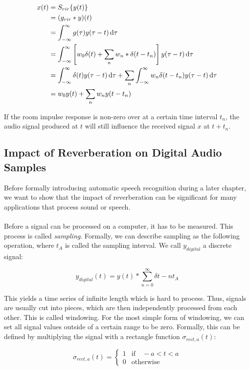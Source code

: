 \begin{align*}
x(t) &= S_{rir}\{y(t)\} \\
     &= (g_{rir} * y)(t) \\
     &= \int_{-\infty}^{\infty} g(\tau)y(\tau - t) \mathop{}\!\mathrm{d}\tau \\
     &= \int_{-\infty}^{\infty} \left[ w_0 \delta(t) + \sum_{n} w_n * \delta(t - t_n)\right] y(\tau - t) \mathop{}\!\mathrm{d}\tau \\
     &= \int_{-\infty}^{\infty} \delta(t) y(\tau - t) \mathop{}\!\mathrm{d}\tau + \sum_{n}  \int_{-\infty}^{\infty} w_n \delta(t - t_n) y(\tau - t) \mathop{}\!\mathrm{d}\tau  \\
     &= w_0 y(t) + \sum_{n} w_n y(t - t_n)
\end{align*}

If the room impulse response is non-zero over at a certain time interval $t_n$, the audio signal produced at $t$ will still influence the received signal $x$ at $t + t_n$. 

\subsection{Impact of Reverberation on Digital Audio Samples}

Before formally introducing automatic speech recognition during a later chapter, we want to show that the impact of reverberation can be significant for many applications that process sound or speech.\\ \\
Before a signal can be processed on a computer, it has to be measured. This process is called \textit{sampling}. Formally, we can describe sampling as the following operation, where $t_A$ is called the sampling interval. We call $y_{digital}$ a discrete signal: 

\[
y_{digital}(t) = y(t) * \sum_{n = 0}^{\infty} \delta{t - nt_A} 
\]

This yields a time series of infinite length which is hard to process. Thus, signals are usually cut into pieces, which are then independently processed from each other. This is called windowing. For the most simple form of windowing, we can set all signal values outside of a certain range to be zero. Formally, this can be defined by multiplying the signal with a rectangle function $\sigma_{rect,a}(t)$:

\[
\sigma_{rect,a}(t) = \begin{cases}
1 & \text{if} \quad -a < t < a \\
0 & \text{otherwise}
\end{cases}
\]

